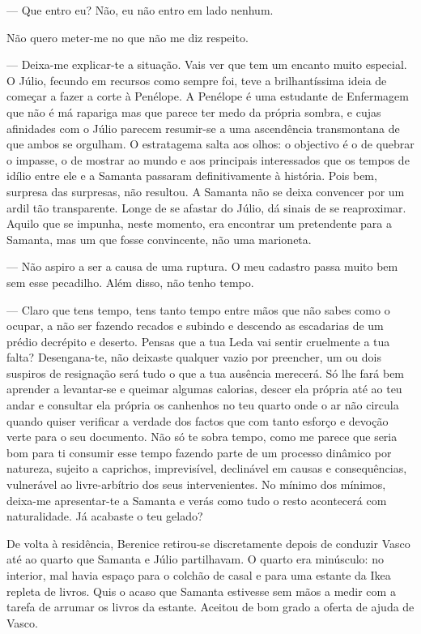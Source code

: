 --- Que entro eu? Não, eu não entro em lado nenhum.

Não quero meter-me no que não me diz respeito.

--- Deixa-me explicar-te a situação. Vais ver que tem um encanto muito
especial. O Júlio, fecundo em recursos como sempre foi, teve a
brilhantíssima ideia de começar a fazer a corte à Penélope. A Penélope
é uma estudante de Enfermagem que não é má rapariga mas que parece ter
medo da própria sombra, e cujas afinidades com o Júlio parecem
resumir-se a uma ascendência transmontana de que ambos se orgulham. O
estratagema salta aos olhos: o objectivo é o de quebrar o impasse, o
de mostrar ao mundo e aos principais interessados
que os tempos de idílio entre ele e a Samanta passaram definitivamente
à história. Pois bem, surpresa das surpresas, não resultou. A Samanta
não se deixa convencer por um ardil tão transparente. Longe de se
afastar do Júlio, dá sinais de se reaproximar. Aquilo que se impunha,
neste momento, era encontrar um pretendente para a Samanta, mas um que
fosse convincente, não uma marioneta.

--- Não aspiro a ser a causa de uma ruptura. O meu cadastro passa muito
  bem sem esse pecadilho. Além disso, não tenho tempo.

--- Claro que tens tempo, tens tanto tempo entre mãos que não sabes como o
  ocupar, a não ser fazendo recados e subindo e descendo as escadarias
  de um prédio decrépito e deserto. Pensas que a tua Leda vai sentir
  cruelmente a tua falta? Desengana-te, não deixaste qualquer vazio por
  preencher, um ou dois suspiros de resignação será tudo o que a tua
  ausência merecerá. Só lhe fará bem aprender a levantar-se e queimar
  algumas calorias, descer ela própria até ao teu andar e consultar
  ela própria os canhenhos no teu quarto onde o ar não circula quando
  quiser verificar a verdade dos factos que com tanto esforço e devoção
  verte para o seu documento. Não só te sobra tempo, como me parece que
  seria bom para ti consumir esse tempo fazendo parte de um processo
  dinâmico por natureza, sujeito a caprichos, imprevisível, declinável
  em causas e consequências, vulnerável ao livre-arbítrio dos seus
  intervenientes. No mínimo dos mínimos, deixa-me apresentar-te a
  Samanta e verás como tudo o resto acontecerá com naturalidade. Já
  acabaste o teu gelado?

De volta à residência, Berenice retirou-se discretamente depois de
conduzir Vasco até ao quarto que Samanta e Júlio partilhavam. O quarto
era minúsculo: no interior, mal havia
espaço para o colchão de casal e para uma estante da Ikea repleta de
livros. Quis o acaso que Samanta estivesse sem mãos a medir com a tarefa
de arrumar os livros da estante. Aceitou de bom grado a oferta de ajuda
de Vasco.

